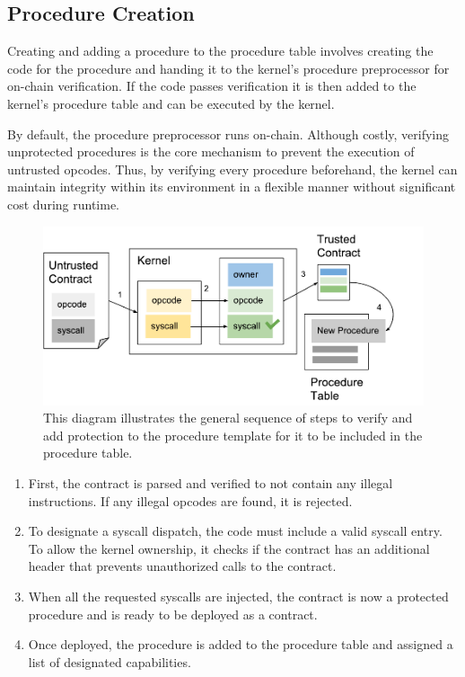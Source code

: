 \documentclass[english,a4paper]{article}
\begin{document}
\subsection{Procedure Creation}\label{procedure-creation}

Creating and adding a procedure to the procedure table involves creating
the code for the procedure and handing it to the kernel's procedure
preprocessor for on-chain verification. If the code passes verification
it is then added to the kernel's procedure table and can be executed by
the kernel.

By default, the procedure preprocessor runs on-chain. Although costly,
verifying unprotected procedures is the core mechanism to prevent the
execution of untrusted opcodes. Thus, by verifying every procedure
beforehand, the kernel can maintain integrity within its environment in
a flexible manner without significant cost during runtime.

\begin{figure}[htbp]
\centering
\includegraphics[width=1\textwidth]{media/ProcedureCreation.pdf}
\caption{This diagram illustrates the general sequence of steps to
verify and add protection to the procedure template for it to be
included in the procedure table.}
\end{figure}


\begin{enumerate}
\def\labelenumi{\arabic{enumi}.}
\item
  First, the contract is parsed and verified to not contain any illegal
  instructions. If any illegal opcodes are found, it is rejected.
\item
  To designate a syscall dispatch, the code must include a valid syscall
  entry. To allow the kernel ownership, it checks if the contract has an
  additional header that prevents unauthorized calls to the contract.
\item
  When all the requested syscalls are injected, the contract is now a
  protected procedure and is ready to be deployed as a contract.
\item
  Once deployed, the procedure is added to the procedure table and
  assigned a list of designated capabilities.
\end{enumerate}
\end{document}

